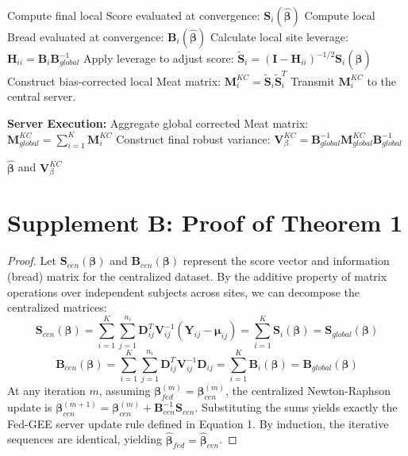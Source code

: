 \documentclass[useAMS,referee, usegraphicx]{biom}
\begin{document}
\begin{algorithm}
\begin{algorithmic}[1]
    \STATE Compute final local Score evaluated at convergence: $\mathbf{S}_i\left(\hat{\boldsymbol{\beta}}\right)$
    \STATE Compute local Bread evaluated at convergence: $\mathbf{B}_i\left(\hat{\boldsymbol{\beta}}\right)$
    \STATE Calculate local site leverage: $\mathbf{H}_{ii} = \mathbf{B}_i \mathbf{B}_{global}^{-1}$
    \STATE Apply leverage to adjust score: $\widetilde{\mathbf{S}}_i = \left(\mathbf{I} - \mathbf{H}_{ii}\right)^{-1/2} \mathbf{S}_i\left(\hat{\boldsymbol{\beta}}\right)$
    \STATE Construct bias-corrected local Meat matrix: $\mathbf{M}_i^{KC} = \widetilde{\mathbf{S}}_i \widetilde{\mathbf{S}}_i^T$
    \STATE Transmit $\mathbf{M}_i^{KC}$ to the central server.
\ENDFOR

\STATE \textbf{Server Execution:}
\STATE Aggregate global corrected Meat matrix: $\mathbf{M}_{global}^{KC} = \sum_{i=1}^K \mathbf{M}_i^{KC}$
\STATE Construct final robust variance: $\mathbf{V}_{\beta}^{KC} = \mathbf{B}_{global}^{-1} \mathbf{M}_{global}^{KC} \mathbf{B}_{global}^{-1}$

\RETURN $\hat{\boldsymbol{\beta}}$ and $\mathbf{V}_{\beta}^{KC}$
\end{algorithmic}
\end{algorithm}

\section{Supplement B: Proof of Theorem 1} \label{a:proof_t1}

\begin{proof}
Let $\mathbf{S}_{cen}(\boldsymbol{\beta})$ and $\mathbf{B}_{cen}(\boldsymbol{\beta})$ represent the score vector and information (bread) matrix for the centralized dataset. By the additive property of matrix operations over independent subjects across sites, we can decompose the centralized matrices:
\begin{equation}
    \mathbf{S}_{cen}(\boldsymbol{\beta}) = \sum_{i=1}^K \sum_{j=1}^{n_i} \mathbf{D}_{ij}^T \mathbf{V}_{ij}^{-1} (\mathbf{Y}_{ij} - \boldsymbol{\mu}_{ij}) = \sum_{i=1}^K \mathbf{S}_i(\boldsymbol{\beta}) = \mathbf{S}_{global}(\boldsymbol{\beta})
\end{equation}
\begin{equation}
    \mathbf{B}_{cen}(\boldsymbol{\beta}) = \sum_{i=1}^K \sum_{j=1}^{n_i} \mathbf{D}_{ij}^T \mathbf{V}_{ij}^{-1} \mathbf{D}_{ij} = \sum_{i=1}^K \mathbf{B}_i(\boldsymbol{\beta}) = \mathbf{B}_{global}(\boldsymbol{\beta})
\end{equation}
At any iteration $m$, assuming $\boldsymbol{\beta}^{(m)}_{fed} = \boldsymbol{\beta}^{(m)}_{cen}$, the centralized Newton-Raphson update is $\boldsymbol{\beta}^{(m+1)}_{cen} = \boldsymbol{\beta}^{(m)}_{cen} + \mathbf{B}_{cen}^{-1} \mathbf{S}_{cen}$. Substituting the sums yields exactly the Fed-GEE server update rule defined in Equation 1. By induction, the iterative sequences are identical, yielding $\hat{\boldsymbol{\beta}}_{fed} = \hat{\boldsymbol{\beta}}_{cen}$.
\end{proof}
\end{document}
